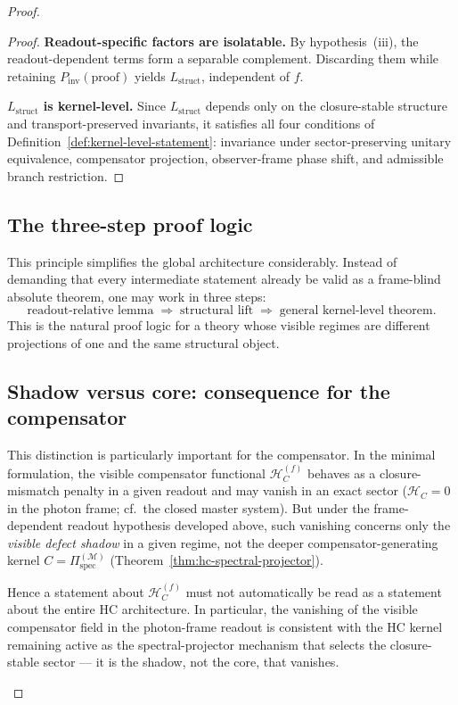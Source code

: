 \begin{proof}
\begin{proof}
\smallskip
\noindent\textbf{Readout-specific factors are isolatable.}
By hypothesis~(iii), the readout-dependent terms form a separable complement.
Discarding them while retaining $P_{\mathrm{inv}}(\text{proof})$ yields
$L_{\mathrm{struct}}$, independent of $f$.

\smallskip
\noindent\textbf{$L_{\mathrm{struct}}$ is kernel-level.}
Since $L_{\mathrm{struct}}$ depends only on the closure-stable structure
and transport-preserved invariants, it satisfies all four conditions of
Definition~\ref{def:kernel-level-statement}: invariance under
sector-preserving unitary equivalence, compensator projection,
observer-frame phase shift, and admissible branch restriction.
\end{proof}

\subsection*{The three-step proof logic}

This principle simplifies the global architecture considerably.
Instead of demanding that every intermediate statement already be valid
as a frame-blind absolute theorem, one may work in three steps:
\[
  \text{readout-relative lemma}
  \;\Longrightarrow\;
  \text{structural lift}
  \;\Longrightarrow\;
  \text{general kernel-level theorem}.
\]
This is the natural proof logic for a theory whose visible regimes are
different projections of one and the same structural object.

\subsection*{Shadow versus core: consequence for the compensator}

\begin{remark}
\label{rem:hc-shadow-vs-core}
This distinction is particularly important for the compensator.
In the minimal formulation, the visible compensator functional
$\mathcal{H}_C^{(f)}$ behaves as a closure-mismatch penalty in a given
readout and may vanish in an exact sector ($\mathcal{H}_C = 0$ in the
photon frame; cf.\ the closed master system). But under the
frame-dependent readout hypothesis developed above, such vanishing
concerns only the \emph{visible defect shadow} in a given regime, not
the deeper compensator-generating kernel
$C = \Pi^{(\mathcal{M})}_{\mathrm{spec}}$
(Theorem~\ref{thm:hc-spectral-projector}).

Hence a statement about $\mathcal{H}_C^{(f)}$ must not automatically be
read as a statement about the entire HC architecture. In particular, the
vanishing of the visible compensator field in the photon-frame readout
is consistent with the HC kernel remaining active as the
spectral-projector mechanism that selects the closure-stable sector ---
it is the shadow, not the core, that vanishes.


\end{remark}
\end{proof}
